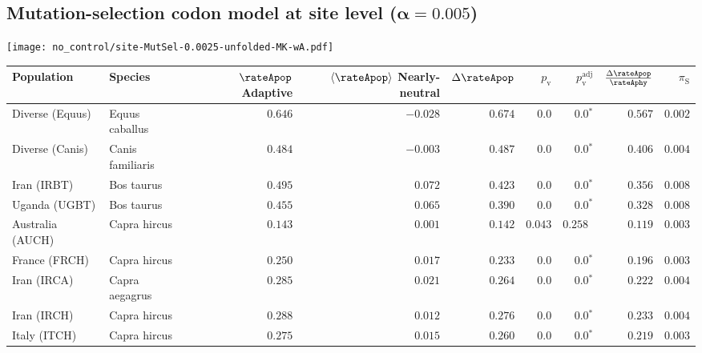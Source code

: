\subsection{Mutation-selection codon model at site level ($\bm{\alpha=0.005}$)}
\begin{center}
    \texttt{[image: no\_control/site-MutSel-0.0025-unfolded-MK-wA.pdf]}
    \begin{adjustbox}{width = 1\textwidth}
        \begin{tabular}{|l|l|r|r|r|r|r|r|r|}
            \toprule
            Population & Species & \specialcell{$\rateApop$ \\ Adaptive}                & \specialcell{$\left< \rateApop \right>$ \\ Nearly-neutral}                & $\Delta \rateApop $    & $p_{\mathrm{v}}$ & $p_{\mathrm{v}}^{\mathrm{adj}}$   & $\frac{\Delta\rateApop}{\rateAphy}$ & $\pi_{\textrm{S}}$    \\
            \midrule
            Diverse (Equus)                    & Equus caballus          & $ 0.646$ & $-0.028$   & $ 0.674$ & $0.0$    & $\bm{0.0{^*}}$ & $ 0.567$ & $ 0.002$ \\
            Diverse (Canis)                  & Canis familiaris          & $ 0.484$ & $-0.003$   & $ 0.487$ & $0.0$    & $\bm{0.0{^*}}$ & $ 0.406$ & $ 0.004$ \\
            Iran (IRBT)               & Bos taurus        & $ 0.495$ & $ 0.072$   & $ 0.423$ & $0.0$ & $\bm{0.0{^*}}$     & $ 0.356$ & $ 0.008$ \\
            Uganda (UGBT)                  & Bos taurus        & $ 0.455$ & $ 0.065$   & $ 0.390$ & $0.0$    & $\bm{0.0{^*}}$ & $ 0.328$ & $ 0.008$ \\
            Australia (AUCH)                    & Capra hircus      & $ 0.143$ & $ 0.001$   & $ 0.142$ & $ 0.043$    & $ 0.258~~$ & $ 0.119$ & $ 0.003$ \\
            France (FRCH)                    & Capra hircus        & $ 0.250$ & $ 0.017$   & $ 0.233$ & $0.0$    & $\bm{0.0{^*}}$ & $ 0.196$ & $ 0.003$ \\
            Iran (IRCA)                   & Capra aegagrus        & $ 0.285$ & $ 0.021$   & $ 0.264$ & $0.0$    & $\bm{0.0{^*}}$ & $ 0.222$ & $ 0.004$ \\
            Iran (IRCH)                 & Capra hircus        & $ 0.288$ & $ 0.012$   & $ 0.276$ & $0.0$    & $\bm{0.0{^*}}$ & $ 0.233$ & $ 0.004$ \\
            Italy (ITCH)                    & Capra hircus          & $ 0.275$ & $ 0.015$   & $ 0.260$ & $0.0$    & $\bm{0.0{^*}}$ & $ 0.219$ & $ 0.003$ \\

\end{tabular}
\end{adjustbox}
\end{center}
